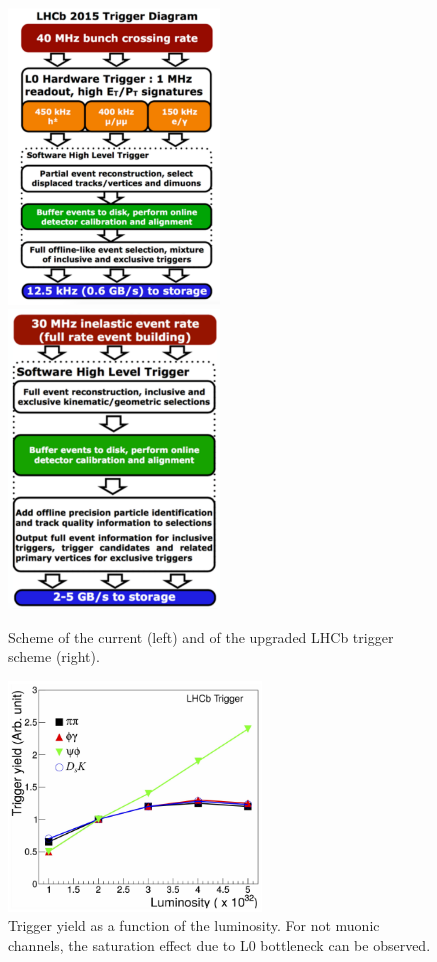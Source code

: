 \begin{figure}[h]
\centerline{
 \includegraphics[width=0.5\textwidth]{figures/Trigger2015.pdf}\\
\includegraphics[width=0.5\textwidth]{figures/TriggerUpgrade.pdf}	}
  \caption{Scheme of the current (left) and of the upgraded LHCb trigger scheme (right).}
  \label{fig:ulhcb_trigger}
\end{figure}

\begin{figure}[h]
\centerline{\includegraphics[width=0.6\textwidth]{figures/L0vsLumi.pdf}}
  \caption{Trigger yield as a function of the luminosity. For not muonic channels, the saturation effect due to L0 bottleneck can be observed.}
  \label{fig:triggervsLumi}
\end{figure}

